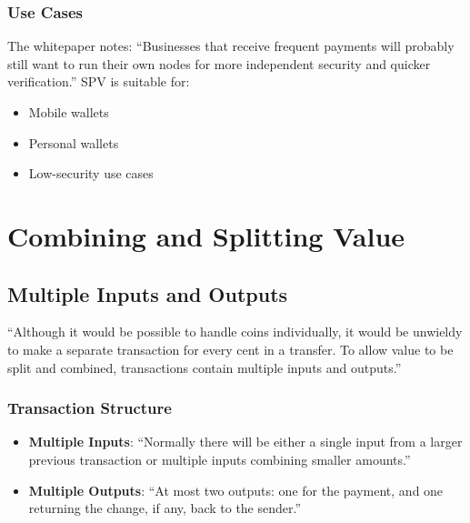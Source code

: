 \subsubsection{Use Cases}

The whitepaper notes: ``Businesses that receive frequent payments will probably still want to run their own nodes for more independent security and quicker verification.'' SPV is suitable for:

\begin{itemize}
  \item Mobile wallets
  \item Personal wallets
  \item Low-security use cases
\end{itemize}


\section{Combining and Splitting Value}
\label{sec:value-composition}

\subsection{Multiple Inputs and Outputs}
\label{subsec:inputs-outputs}

``Although it would be possible to handle coins individually, it would be unwieldy to make a separate transaction for every cent in a transfer. To allow value to be split and combined, transactions contain multiple inputs and outputs.''

\subsubsection{Transaction Structure}

\begin{itemize}
  \item \textbf{Multiple Inputs}: ``Normally there will be either a single input from a larger previous transaction or multiple inputs combining smaller amounts.''

  \item \textbf{Multiple Outputs}: ``At most two outputs: one for the payment, and one returning the change, if any, back to the sender.''
\end{itemize}

